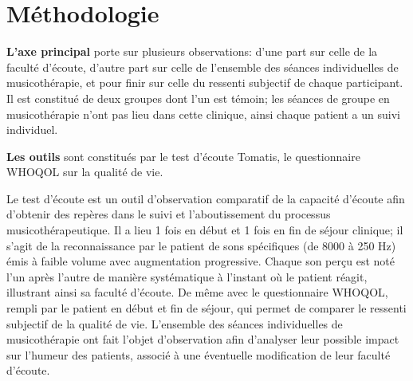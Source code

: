 \chapter{Méthodologie} 
 \textbf{L'axe principal} porte sur plusieurs observations: d'une part sur celle de la faculté d'écoute,  
d'autre part sur celle de l'ensemble 
des séances individuelles
de musicothérapie, et pour finir sur celle du ressenti subjectif de chaque participant. Il est constitué 
de deux groupes dont l'un est témoin; les séances de groupe en musicothérapie n'ont pas lieu dans 
cette clinique, ainsi chaque patient a un suivi individuel.  %


\textbf{Les outils} sont constitués par  le test d'écoute Tomatis, le questionnaire WHOQOL sur la 
qualité de vie.%


Le test d'écoute est  un outil d'observation comparatif  de la capacité d'écoute afin 
d'obtenir des repères 
dans le suivi et l'aboutissement du processus musicothérapeutique.
Il a lieu 1 fois en 
début et 1 fois en fin de séjour clinique; il s'agit de la reconnaissance par le patient  de sons 
spécifiques (de 8000 à 250 Hz) émis à faible volume avec augmentation progressive. 
Chaque son perçu est noté l'un après l'autre de manière systématique à l'instant où le patient réagit, 
illustrant  ainsi sa faculté d'écoute.
De même avec le questionnaire WHOQOL, rempli par le patient en début et fin de séjour, qui permet de 
comparer le 
ressenti subjectif de la qualité de vie.
L'ensemble des séances individuelles de musicothérapie ont fait  l'objet d'observation afin d'analyser 
leur possible impact sur l'humeur des patients, associé à une éventuelle modification de leur faculté 
d'écoute.

